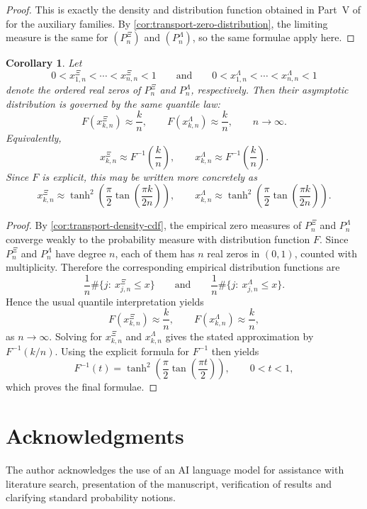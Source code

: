 \documentclass[11pt,twoside]{article}
\newtheorem{corollary}[theorem]{Corollary}
\numberwithin{equation}{section}
\begin{document}
\begin{proof}
This is exactly the density and distribution function obtained in Part~V of
\cite{TallaWaffo2026arxiv2602.16761} for the auxiliary families. By
\cref{cor:transport-zero-distribution}, the limiting measure is the same for
\((P_n^\Xi)\) and \((P_n^\Lambda)\), so the same formulae apply here.
\end{proof}

\begin{corollary}\label{cor:transport-quantiles}
Let
\[
0<x_{1,n}^\Xi<\cdots<x_{n,n}^\Xi<1
\qquad\text{and}\qquad
0<x_{1,n}^\Lambda<\cdots<x_{n,n}^\Lambda<1
\]
denote the ordered real zeros of \(P_n^\Xi\) and \(P_n^\Lambda\), respectively.
Then their asymptotic distribution is governed by the same quantile law:
\[
F(x_{k,n}^\Xi)\approx \frac{k}{n},
\qquad
F(x_{k,n}^\Lambda)\approx \frac{k}{n},
\qquad n\to\infty.
\]
Equivalently,
\[
x_{k,n}^\Xi \approx F^{-1}\!\left(\frac{k}{n}\right),
\qquad
x_{k,n}^\Lambda \approx F^{-1}\!\left(\frac{k}{n}\right).
\]
Since \(F\) is explicit, this may be written more concretely as
\[
x_{k,n}^\Xi \approx
\tanh^2\!\left(
\frac{\pi}{2}\tan\!\left(\frac{\pi k}{2n}\right)
\right),
\qquad
x_{k,n}^\Lambda \approx
\tanh^2\!\left(
\frac{\pi}{2}\tan\!\left(\frac{\pi k}{2n}\right)
\right).
\]
\end{corollary}

\begin{proof}
By \cref{cor:transport-density-cdf}, the empirical zero measures of
\(P_n^\Xi\) and \(P_n^\Lambda\) converge weakly to the probability measure with
distribution function \(F\). Since \(P_n^\Xi\) and \(P_n^\Lambda\) have degree
\(n\), each of them has \(n\) real zeros in \((0,1)\), counted with
multiplicity. Therefore the corresponding empirical distribution functions are
\[
\frac{1}{n}\#\{j:\ x_{j,n}^\Xi\le x\}
\qquad\text{and}\qquad
\frac{1}{n}\#\{j:\ x_{j,n}^\Lambda\le x\}.
\]
Hence the usual quantile interpretation yields
\[
F(x_{k,n}^\Xi)\approx \frac{k}{n},
\qquad
F(x_{k,n}^\Lambda)\approx \frac{k}{n},
\]
as \(n\to\infty\). Solving for \(x_{k,n}^\Xi\) and \(x_{k,n}^\Lambda\) gives the
stated approximation by \(F^{-1}(k/n)\). Using the explicit formula for
\(F^{-1}\) then yields
\[
F^{-1}(t)=\tanh^2\!\left(\frac{\pi}{2}\tan\!\left(\frac{\pi t}{2}\right)\right),
\qquad 0<t<1,
\]
which proves the final formulae.
\end{proof}

\section*{Acknowledgments}
The author acknowledges the use of an AI language model for assistance with literature search, presentation of the manuscript, verification of results and clarifying standard probability notions.

\printbibliography
\end{document}
